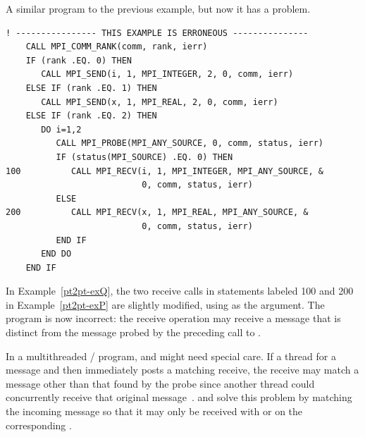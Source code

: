 \begin{example}
\label{pt2pt-exQ}
%
%
A similar program to the previous example, but now it
has a problem.

\begin{lstlisting}[language={[MPI]Fortran}]
! ---------------- THIS EXAMPLE IS ERRONEOUS ---------------
    CALL MPI_COMM_RANK(comm, rank, ierr)
    IF (rank .EQ. 0) THEN
       CALL MPI_SEND(i, 1, MPI_INTEGER, 2, 0, comm, ierr)
    ELSE IF (rank .EQ. 1) THEN
       CALL MPI_SEND(x, 1, MPI_REAL, 2, 0, comm, ierr)
    ELSE IF (rank .EQ. 2) THEN
       DO i=1,2
          CALL MPI_PROBE(MPI_ANY_SOURCE, 0, comm, status, ierr)
          IF (status(MPI_SOURCE) .EQ. 0) THEN
100          CALL MPI_RECV(i, 1, MPI_INTEGER, MPI_ANY_SOURCE, &
                           0, comm, status, ierr)
          ELSE
200          CALL MPI_RECV(x, 1, MPI_REAL, MPI_ANY_SOURCE, &
                           0, comm, status, ierr)
          END IF
       END DO
    END IF
\end{lstlisting}

In Example~\ref{pt2pt-exQ},
the two receive calls in statements labeled 100 and 200 in
Example~\ref{pt2pt-exP} are
slightly modified,
using  as the 
argument.
The program is now incorrect: the receive operation may receive a message that
is distinct from the message probed by the preceding call to
.
\end{example}

\begin{users}
In a multithreaded \MPI/ program,  and
 might need special care.
If a thread  for a message and then immediately posts a matching
receive, the receive may match a message other than that found by the probe since another thread could concurrently receive that original
message~\cite{mprobe-paper}.
 and  solve this problem by
matching the incoming message so that it may only be received with
 or  on the corresponding .
\end{users}

